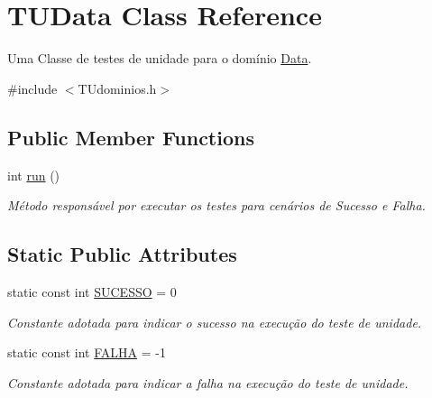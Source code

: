 \hypertarget{classTUData}{}\section{T\+U\+Data Class Reference}
\label{classTUData}


Uma Classe de testes de unidade para o domínio \hyperlink{classData}{Data}.  




{\ttfamily \#include $<$T\+Udominios.\+h$>$}

\subsection*{Public Member Functions}
\begin{DoxyCompactItemize}
\item 
int \hyperlink{classTUData_a4fd95b821fa6d55bdc82be6f3a3cbef2}{run} ()
\begin{DoxyCompactList}\small\item\em Método responsável por executar os testes para cenários de Sucesso e Falha. \end{DoxyCompactList}\end{DoxyCompactItemize}
\subsection*{Static Public Attributes}
\begin{DoxyCompactItemize}
\item 
\mbox{\label{classTUData_a59be2c38007b733030111a5aadfb4517}} 
static const int \hyperlink{classTUData_a59be2c38007b733030111a5aadfb4517}{S\+U\+C\+E\+S\+SO} = 0
\begin{DoxyCompactList}\small\item\em Constante adotada para indicar o sucesso na execução do teste de unidade. \end{DoxyCompactList}\item 
\mbox{\label{classTUData_a691cfac8c7fc4b3da149ef868de44f35}} 
static const int \hyperlink{classTUData_a691cfac8c7fc4b3da149ef868de44f35}{F\+A\+L\+HA} = -\/1
\begin{DoxyCompactList}\small\item\em Constante adotada para indicar a falha na execução do teste de unidade. \end{DoxyCompactList}\end{DoxyCompactItemize}


